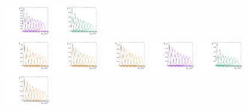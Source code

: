 \begin{figure}[htbp]
  \includegraphics[width=0.18\textwidth]{fig/2Dfit/templateSignalVsMX_fromDC_WprToWZ_MVV_mu_LP_bb_HDy.pdf}
  \includegraphics[width=0.18\textwidth]{fig/2Dfit/templateSignalVsMX_fromDC_WprToWH_MVV_mu_LP_bb_HDy.pdf}\\
  \includegraphics[width=0.18\textwidth]{fig/2Dfit/templateSignalVsMX_fromDC_GbuToWW_MVV_mu_HP_nobb_HDy.pdf}
  \includegraphics[width=0.18\textwidth]{fig/2Dfit/templateSignalVsMX_fromDC_RadToWW_MVV_mu_HP_nobb_HDy.pdf}
  \includegraphics[width=0.18\textwidth]{fig/2Dfit/templateSignalVsMX_fromDC_ZprToWW_MVV_mu_HP_nobb_HDy.pdf}
  \includegraphics[width=0.18\textwidth]{fig/2Dfit/templateSignalVsMX_fromDC_WprToWZ_MVV_mu_HP_nobb_HDy.pdf}
  \includegraphics[width=0.18\textwidth]{fig/2Dfit/templateSignalVsMX_fromDC_WprToWH_MVV_mu_HP_nobb_HDy.pdf}\\
  \includegraphics[width=0.18\textwidth]{fig/2Dfit/templateSignalVsMX_fromDC_GbuToWW_MVV_mu_LP_nobb_HDy.pdf}

\end{figure}
